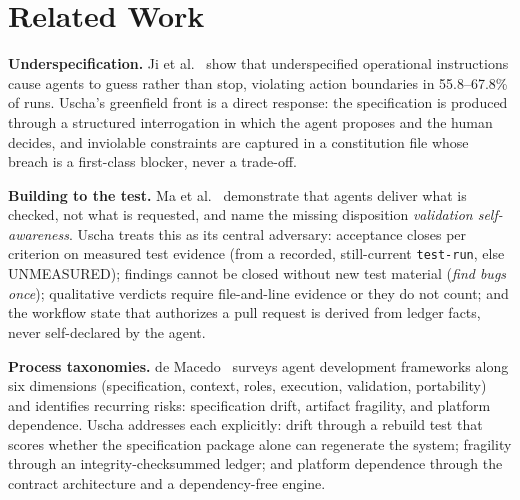 \documentclass[11pt]{article}
\begin{document}
\section{Related Work}\label{sec:related}

\textbf{Underspecification.} Ji et al.~\cite{ji2026guessing} show that
underspecified operational instructions cause agents to guess rather than
stop, violating action boundaries in 55.8--67.8\% of runs. Uscha's
greenfield front is a direct response: the specification is produced through a
structured interrogation in which the agent proposes and the human decides,
and inviolable constraints are captured in a constitution file whose breach is
a first-class blocker, never a trade-off.

\textbf{Building to the test.} Ma et al.~\cite{ma2026building} demonstrate
that agents deliver what is checked, not what is requested, and name the
missing disposition \emph{validation self-awareness}. Uscha treats this as
its central adversary: acceptance closes per criterion on measured test
evidence (from a recorded, still-current \texttt{test-run}, else UNMEASURED); findings cannot be closed without new test material (\emph{find bugs
once}); qualitative verdicts require file-and-line evidence or they do not
count; and the workflow state that authorizes a pull request is derived from
ledger facts, never self-declared by the agent.

\textbf{Process taxonomies.} de Macedo~\cite{demacedo2026prompt} surveys agent
development frameworks along six dimensions (specification, context, roles,
execution, validation, portability) and identifies recurring risks:
specification drift, artifact fragility, and platform dependence. Uscha
addresses each explicitly: drift through a rebuild test that scores whether
the specification package alone can regenerate the system; fragility through
an integrity-checksummed ledger; and platform dependence through the contract
architecture and a dependency-free engine.
\end{document}

